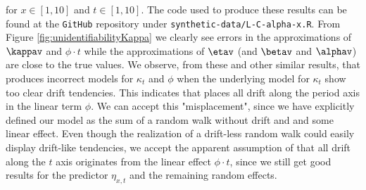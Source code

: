 for $x\in[1,10]$ and $t\in[1,10]$. The code used to produce these results can be found at the \texttt{GitHub} repository under \texttt{synthetic-data/L-C-alpha-x.R}. From Figure \ref{fig:unidentifiabilityKappa} we clearly see errors in the approximations of $\kappav$ and $\phi\cdot t$ while the approximations of $\etav$ (and $\betav$ and $\alphav$) are close to the true values. We observe, from these and other similar results, that \inlabru produces incorrect models for $\kappa_t$ and $\phi$ when the underlying model for $\kappa_t$ show too clear drift tendencies. This indicates that \inlabru places all drift along the period axis in the linear term $\phi$. We can accept this "misplacement", since we have explicitly defined our model as the sum of a random walk without drift and and some linear effect. Even though the realization of a drift-less random walk could easily display drift-like tendencies, we accept the apparent assumption of \inlabru that all drift along the $t$ axis originates from the linear effect $\phi \cdot t$, since we still get good results for the predictor $\eta_{x,t}$ and the remaining random effects.
\newline
